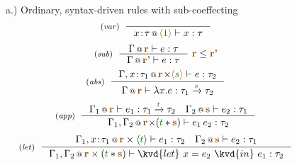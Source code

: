 \begin{figure}[t]
{\small a.) Ordinary, syntax-driven rules with sub-coeffecting}
\begin{equation*}
\tyrule{var}{}
  {\coctx{x \!:\! \tau}{\alift{\cclrd{1}}} \vdash x : \tau} 
\end{equation*}
\begin{equation*}
\tyrule{sub}
  {\coctx{\Gamma}{\aclrd{\textbf{r}}} \vdash e : \tau}
  {\coctx{\Gamma}{\aclrd{\textbf{r'}}} \vdash e : \tau}~\aclrd{\textbf{r}} \leq \aclrd{\textbf{r'}}
\end{equation*}
\begin{equation*}
\tyrule{abs}
  {\coctx{\Gamma, x \!:\! \tau_1}{\aclrd{\textbf{r}} \cons \alift{\cclrd{s}}} \vdash e : \tau_2}
  {\coctx{\Gamma}{\aclrd{\textbf{r}}} \vdash \lambda x . e : \tau_1 \xrightarrow{\cclrd{s}} \tau_2} 
\end{equation*}
\begin{equation*}
\tyrule{app}
  { \coctx{\Gamma_1}{\aclrd{\textbf{r}}} \vdash e_1 : \tau_1 \xrightarrow{\cclrd{t}} \tau_2 \quad 
    \coctx{\Gamma_2}{\aclrd{\textbf{s}}} \vdash e_2 : \tau_1}
  { \coctx{\Gamma_1, \Gamma_2}{\aclrd{\textbf{r}} \cons (\cclrd{t} \ast \aclrd{\textbf{s}})} \vdash e_1 \, e_2 : \tau_2} 
\end{equation*}
\begin{equation*}
\tyrule{let}
  { \coctx{\Gamma_1, x \!:\! \tau_1}{\aclrd{\textbf{r}} \times \langle{\cclrd{t}}\rangle} \vdash e_1 : \tau_2 \quad 
    \coctx{\Gamma_2}{\aclrd{\textbf{s}}} \vdash e_2 : \tau_1}
  {\coctx{\Gamma_1, \Gamma_2}{\aclrd{\textbf{r}} \times (\cclrd{t} \ast \aclrd{\textbf{s}})} \vdash \kvd{let}~x=e_2~\kvd{in}~e_1 : \tau_2}
\end{equation*}
\vspace{0.5em}


\end{figure}
